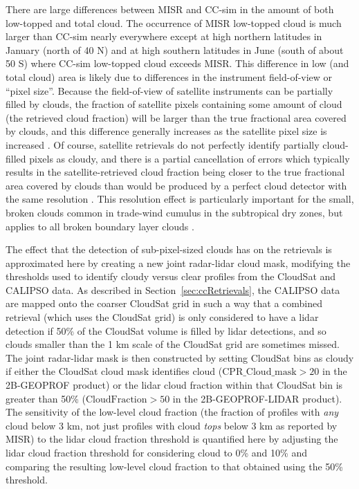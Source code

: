 There are large differences between MISR and CC-sim in the amount of
both low-topped and total cloud. The occurrence of MISR low-topped cloud
is much larger than CC-sim nearly everywhere except at high northern
latitudes in January (north of 40 N) and at high southern latitudes in
June (south of about 50 S) where CC-sim low-topped cloud exceeds MISR.
This difference in low (and total cloud) area is likely due to
differences in the instrument field-of-view or ``pixel size''. Because
the field-of-view of satellite instruments can be partially filled by
clouds, the fraction of satellite pixels containing some amount of cloud
(the retrieved cloud fraction) will be larger than the true fractional
area covered by clouds, and this difference generally increases as the
satellite pixel size is increased \citep{digirolamo_and_davies_1997}. Of
course, satellite retrievals do not perfectly identify partially
cloud-filled pixels as cloudy, and there is a partial cancellation of
errors which typically results in the satellite-retrieved cloud fraction
being closer to the true fractional area covered by clouds than would be
produced by a perfect cloud detector with the same resolution
\citep{wielicki_and_parker_1992}. This resolution effect is particularly
important for the small, broken clouds common in trade-wind cumulus in
the subtropical dry zones, but applies to all broken boundary layer
clouds \citep{zhao_and_digirolamo_2006, marchand_et_al_2010}.

The effect that the detection of sub-pixel-sized clouds has on the
retrievals is approximated here by creating a new joint radar-lidar
cloud mask, modifying the thresholds used to identify cloudy versus
clear profiles from the CloudSat and CALIPSO data. As described in
Section~\ref{sec:ccRetrievals}, the CALIPSO data are mapped onto the
coarser CloudSat grid in such a way that a combined retrieval (which
uses the CloudSat grid) is only considered to have a lidar detection if
50\% of the CloudSat volume is filled by lidar detections, and so clouds
smaller than the 1 km scale of the CloudSat grid are sometimes missed.
The joint radar-lidar mask is then constructed by setting CloudSat bins
as cloudy if either the CloudSat cloud mask identifies cloud
(\(\textrm{CPR\_Cloud\_mask} > 20\) in the 2B-GEOPROF product) or the
lidar cloud fraction within that CloudSat bin is greater than 50\%
(\(\textrm{CloudFraction} > 50\) in the 2B-GEOPROF-LIDAR product). The
sensitivity of the low-level cloud fraction (the fraction of profiles
with \emph{any} cloud below 3 km, not just profiles with cloud
\emph{tops} below 3 km as reported by MISR) to the lidar cloud fraction
threshold is quantified here by adjusting the lidar cloud fraction
threshold for considering cloud to 0\% and 10\% and comparing the
resulting low-level cloud fraction to that obtained using the 50\%
threshold.

